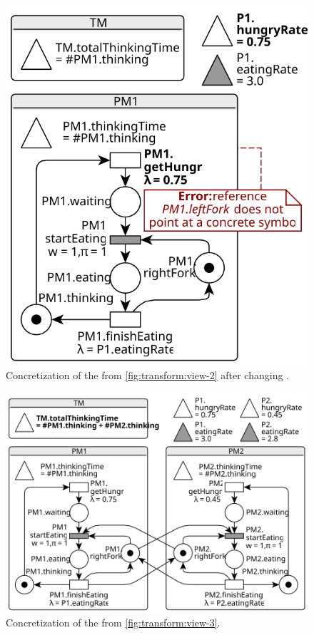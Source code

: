 \begin{figure}[p]
\begin{minipage}[t]{0.5\textwidth}
    \includegraphics[scale=0.9]{figures/concrete_rgspn_example_2}
    \caption{\protect\RaggedRight Concretization of the  from \vref{fig:transform:view-2} after changing .}
    \label{fig:transform:concrete-2}
  \end{minipage}%
\end{figure}

\begin{figure}[p]
  \centering
  \includegraphics[scale=0.9]{figures/concrete_rgspn_example}
  \caption{Concretization of the  from \vref{fig:transform:view-3}.}
  \label{fig:transform:concrete-3}
\end{figure}

